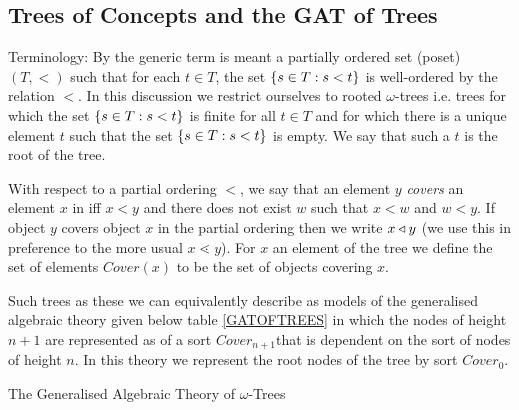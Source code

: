 \subsection {Trees of Concepts and the GAT of Trees}

\renewcommand{\highlight}[1]{#1}  %
 
Terminology: By  the generic term  is meant a partially ordered set (poset) $(T, <)$ such that for each $t \in T$, the set $\left\{s \in T : s < t\right\}$ is well-ordered by the relation $<$.
In this discussion we restrict ourselves to \highlight{rooted $\omega$-trees} i.e. trees for which the set $\left\{s \in T : s < t\right\}$
is finite for all $t \in T$ and for which there is a unique element $t$ such that
 the set $\left\{s \in T : s < t\right\}$ is empty. We say that such a $t$ is the root of the tree.

With respect to a partial ordering $<$, we say that \highlight{an element $y$ \textit{covers}  an element $x$} in  iff $x<y$ and there does not exist $w$ such that $x < w$ and $w < y$.
If object $y$ covers object $x$ in the partial ordering 
then we write \highlight{$x \triangleleft y$} (we use this in preference to the more usual $x \lessdot y$).
For $x$ an element of the tree we define the set of elements  \highlight{$Cover(x)$} to be the set of objects covering $x$.

Such trees as these we can equivalently describe as models of the generalised algebraic theory given below table \ref{GATOFTREES} in which the nodes of height $n+1$ are represented as of a sort $Cover_{n+1}$that is dependent on the sort of nodes of height $n$. In this theory we represent the root nodes of the tree by sort $Cover_0$.

\newcommand{\Ft}[1]{\downarrow \kern -0.325em #1}


\newcommand{\Si}[1]{C\kern-1pt over_{#1}}
\newcommand{\ofSi}[3]{\ofT{#1}{\Si{#2}(#3)}}
\newcommand{\Sz}{\Si{0}}                                           %
\newcommand{\ofS}[1]{\ofT{#1}{\Sz}}
\vspace{0.03cm} 
\begin{table}[H]
\caption{The Generalised Algebraic Theory of $\omega$-Trees}
\label{GATOFTREES}

\end{table} 

